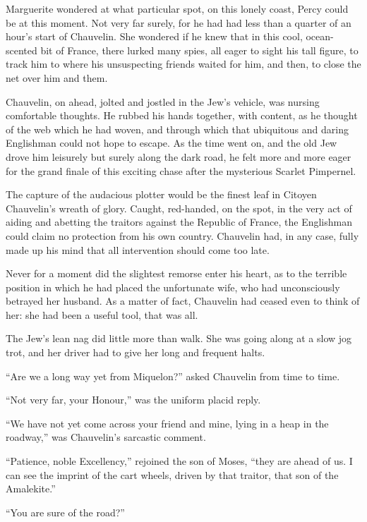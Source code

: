 \documentclass[paper=a5,BCOR=7mm,twoside,DIV=calc,12pt,usegeometry,chapterprefix,endperiod,headings=big]{scrbook}
\begin{document}
Marguerite wondered at what particular spot, on this lonely coast, Percy could be at this moment. Not very far surely, for he had had less than a quarter of an hour's start of Chauvelin. She wondered if he knew that in this cool, ocean-scented bit of France, there lurked many spies, all eager to sight his tall figure, to track him to where his unsuspecting friends waited for him, and then, to close the net over him and them.

Chauvelin, on ahead, jolted and jostled in the Jew's vehicle, was nursing comfortable thoughts. He rubbed his hands together, with content, as he thought of the web which he had woven, and through which that ubiquitous and daring Englishman could not hope to escape. As the time went on, and the old Jew drove him leisurely but surely along the dark road, he felt more and more eager for the grand finale of this exciting chase after the mysterious Scarlet Pimpernel.

The capture of the audacious plotter would be the finest leaf in Citoyen Chauvelin's wreath of glory. Caught, red-handed, on the spot, in the very act of aiding and abetting the traitors against the Republic of France, the Englishman could claim no protection from his own country. Chauvelin had, in any case, fully made up his mind that all intervention should come too late.

Never for a moment did the slightest remorse enter his heart, as to the terrible position in which he had placed the unfortunate wife, who had unconsciously betrayed her husband. As a matter of fact, Chauvelin had ceased even to think of her: she had been a useful tool, that was all.

The Jew's lean nag did little more than walk. She was going along at a slow jog trot, and her driver had to give her long and frequent halts.

\enquote{Are we a long way yet from Miquelon?} asked Chauvelin from time to time.

\enquote{Not very far, your Honour,} was the uniform placid reply.

\enquote{We have not yet come across your friend and mine, lying in a heap in the roadway,} was Chauvelin's sarcastic comment.

\enquote{Patience, noble Excellency,} rejoined the son of Moses, \enquote{they are ahead of us. I can see the imprint of the cart wheels, driven by that traitor, that son of the Amalekite.}

\enquote{You are sure of the road?}
\end{document}
